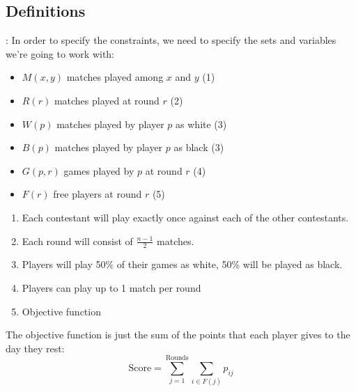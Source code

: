 \documentclass[9pt, aspectratio=169, xcolor=table]{beamer}
\begin{document}
\subsection{Definitions}
\begin{frame}{\secname: \subsecname}
    In order to specify the constraints, we need to specify the sets and variables we're going to work with:
    \vspace{1cm}

    \begin{minipage}{0.49\textwidth}
	\begin{itemize}
	    \item $M(x, y)$ matches played among $x$ and $y$ (\textcolor{Veronablue}{1})
	    \item $R(r)$  matches played at round $r$ (\textcolor{Veronablue}{2})
	    \item $W(p)$ matches played by player $p$ as white (\textcolor{Veronablue}{3})
	    \item $B(p)$ matches played by player $p$ as black (\textcolor{Veronablue}{3})
	    \item $G(p,r)$ games played by $p$ at round $r$ (\textcolor{Veronablue}{4})
	    \item $F(r)$ free players at round $r$ (\textcolor{Veronablue}{5})
	\end{itemize}
    \end{minipage}
    \hfill
    \begin{minipage}{0.49\textwidth}
	\begin{enumerate}
	    \item Each contestant will play exactly once against each of the other contestants.
	    \item Each round will consist of $\frac{n-1}{2}$ matches.
	    \item Players will play 50\% of their games as white, 50\% will be played as black.
	    \item Players can play up to 1 match per round
	    \item Objective function
	\end{enumerate}
    \end{minipage}
    \vspace{1cm}

    The objective function is just the sum of the points that each player gives to the day they rest:
    \begin{equation*}
	\text{Score} = \sum_{j = 1}^{\text{Rounds}} \sum_{i \in F(j)}  p_{ij}
    \end{equation*}
    
\end{frame}
\end{document}
